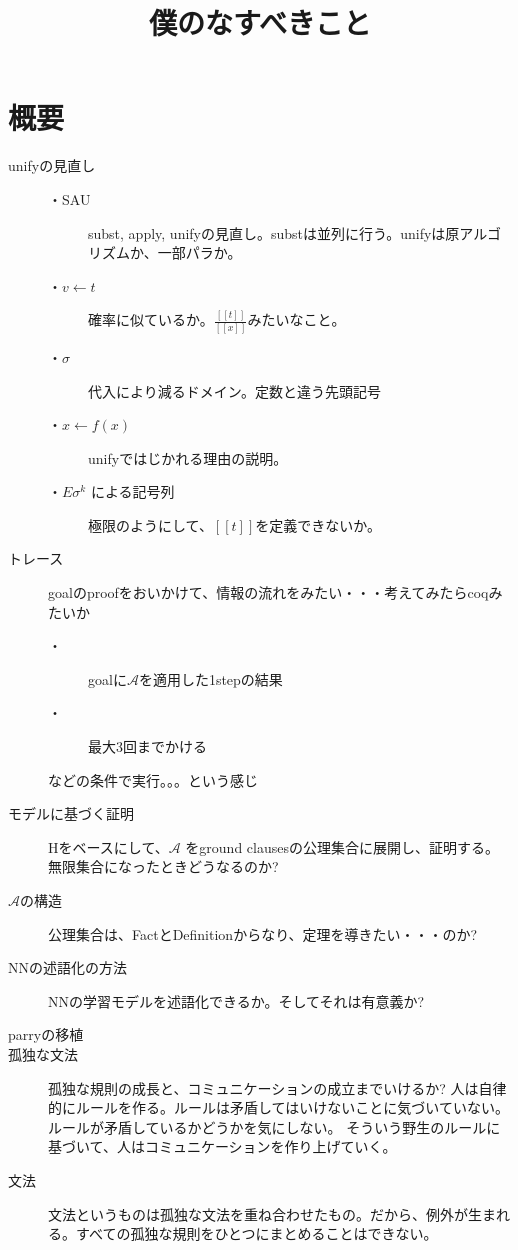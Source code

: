 \documentclass[10pt, oneside]{jarticle}   	%
\title{僕のなすべきこと}
\author{\myname}
\begin{document}
\maketitle

\section{概要}
\begin{description}
\item[unifyの見直し] 
\begin{description}
\item[ ・SAU] subst, apply, unifyの見直し。substは並列に行う。unifyは原アルゴリズムか、一部パラか。 
\item[ ・$v \leftarrow t$] 確率に似ているか。$\frac{[[t]]}{[[x]]}$みたいなこと。
\item[ ・$\sigma$] 代入により減るドメイン。定数と違う先頭記号
\item[ ・$x\leftarrow f(x)$]  unifyではじかれる理由の説明。
\item[ ・$E\sigma^k$ による記号列] 極限のようにして、$[[t]]$を定義できないか。
\end{description}

\item[トレース] goalのproofをおいかけて、情報の流れをみたい・・・考えてみたらcoqみたいか
\begin{description}
\item[ ・]  goalに$\mathcal{A}$を適用した1stepの結果
\item[・] 最大3回までかける
\end{description}
などの条件で実行。。。という感じ

\item[ モデルに基づく証明] Hをベースにして、$\mathcal{A}$ をground clausesの公理集合に展開し、証明する。
無限集合になったときどうなるのか?
\item[ $\mathcal{A}$の構造] 公理集合は、FactとDefinitionからなり、定理を導きたい・・・のか?
\item[ NNの述語化の方法] NNの学習モデルを述語化できるか。そしてそれは有意義か?
\item[ parryの移植] 
\item[ 孤独な文法] 孤独な規則の成長と、コミュニケーションの成立までいけるか?
人は自律的にルールを作る。ルールは矛盾してはいけないことに気づいていない。ルールが矛盾しているかどうかを気にしない。
そういう野生のルールに基づいて、人はコミュニケーションを作り上げていく。
\item[ 文法] 文法というものは孤独な文法を重ね合わせたもの。だから、例外が生まれる。すべての孤独な規則をひとつにまとめることはできない。


\end{description}
\end{document}
